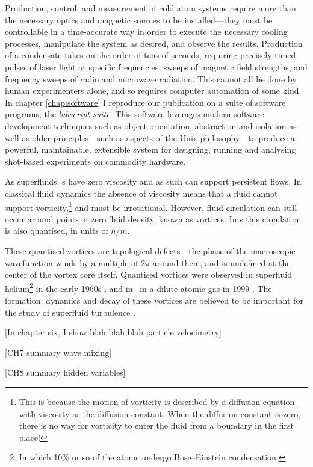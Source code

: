 Production, control, and measurement of cold atom systems require more than the necessary optics and magnetic sources to be installed---they must be controllable in a time-accurate way in order to execute the necessary cooling processes, manipulate the system as desired, and observe the results. Production of a condensate takes on the order of tens of seconds, requiring precisely timed pulses of laser light at specific frequencies, sweeps of magnetic field strengths, and frequency sweeps of radio and microwave radiation. This cannot all be done by human experimenters alone, and so requires computer automation of some kind. In chapter \ref{chap:software} I reproduce our publication on a suite of software programs, the \emph{labscript suite}. This software leverages modern software development techniques such as object orientation, abstraction and isolation as well as older principles---such as aspects of the Unix philosophy---to produce a powerful, maintainable, extensible system for designing, running and analysing shot-based experiments on commodity hardware.

As superfluids, \bec s have zero viscosity and as such can support persistent flows. In classical fluid dynamics the absence of viscosity means that a fluid cannot support vorticity,\footnote{This is because the motion of vorticity is described by a diffusion equation---with viscosity as the diffusion constant. When the diffusion constant is zero, there is no way for vorticity to enter the fluid from a boundary in the first place!} and must be irrotational. However, fluid circulation can still occur around points of zero fluid density, known as vortices. In \bec s this circulation is also quantised, in units of $h/m$.

These quantised vortices are topological defects---the phase of the macroscopic wavefunction winds by a multiple of $2\pi$ around them, and is undefined at the center of the vortex core itself.  Quantised vortices were observed in superfluid helium\footnote{In which 10\% or so of the atoms undergo Bose--Einstein condensation.} in the early 1960s \cite{vinen_detection_1961}, and in \bec\ in a dilute atomic gas in 1999 \cite{matthews_vortices_1999}. The formation, dynamics and decay of these vortices are believed to be important for the study of superfluid turbulence \cite{barenghi_quantized_2001}.

[In chapter six, I show blah blah blah particle velocimetry]

[CH7 summary wave mixing]

[CH8 summary hidden variables]



